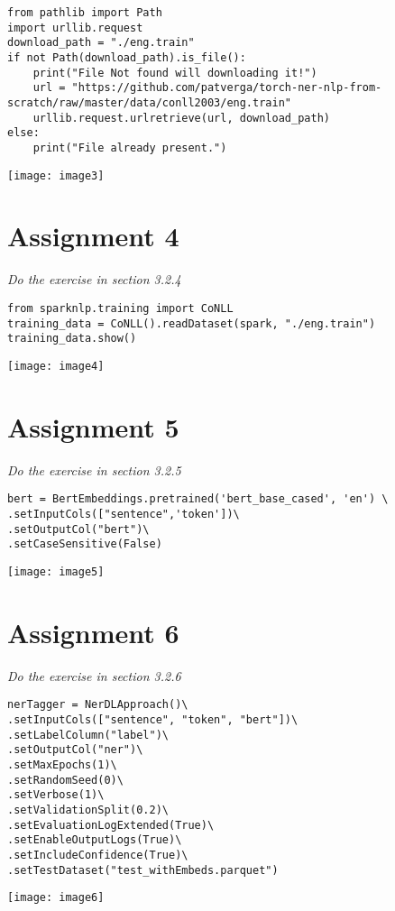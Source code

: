\documentclass[]{article}
\begin{document}
\begin{verbatim}
from pathlib import Path
import urllib.request
download_path = "./eng.train"
if not Path(download_path).is_file():
	print("File Not found will downloading it!")
	url = "https://github.com/patverga/torch-ner-nlp-from-scratch/raw/master/data/conll2003/eng.train"
	urllib.request.urlretrieve(url, download_path)
else:
	print("File already present.")
\end{verbatim}
\texttt{[image: image3]} %


\section*{Assignment 4}
\emph{ Do the exercise in section 3.2.4 }

\begin{verbatim}
from sparknlp.training import CoNLL
training_data = CoNLL().readDataset(spark, "./eng.train")
training_data.show()
\end{verbatim}
\texttt{[image: image4]} %


\section*{Assignment 5}
\emph{ Do the exercise in section 3.2.5 }

\begin{verbatim}
bert = BertEmbeddings.pretrained('bert_base_cased', 'en') \
.setInputCols(["sentence",'token'])\
.setOutputCol("bert")\
.setCaseSensitive(False)
\end{verbatim}
\texttt{[image: image5]} %


\section*{Assignment 6}
\emph{ Do the exercise in section 3.2.6 }

\begin{verbatim}
nerTagger = NerDLApproach()\
.setInputCols(["sentence", "token", "bert"])\
.setLabelColumn("label")\
.setOutputCol("ner")\
.setMaxEpochs(1)\
.setRandomSeed(0)\
.setVerbose(1)\
.setValidationSplit(0.2)\
.setEvaluationLogExtended(True)\
.setEnableOutputLogs(True)\
.setIncludeConfidence(True)\
.setTestDataset("test_withEmbeds.parquet")
\end{verbatim}
\texttt{[image: image6]} %
\end{document}
